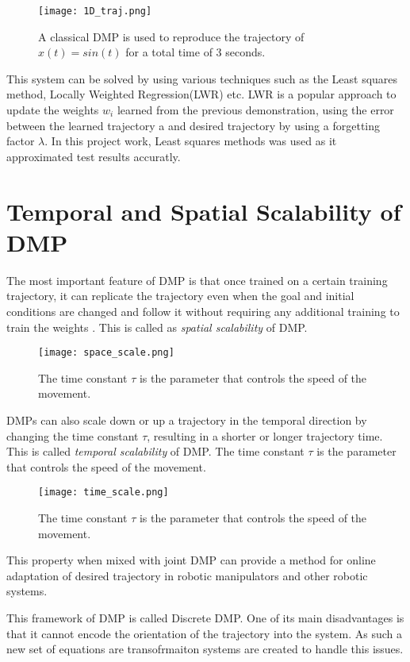 \begin{figure}[h]
    \centering
    \texttt{[image: 1D\_traj.png]}
    \caption{A classical DMP is used to reproduce the trajectory of $x(t) = sin(t)$ for a total time of 3 seconds.} %
\end{figure}
This system can be solved by using various techniques such as the Least squares method, Locally Weighted Regression(LWR)\cite{LWR_paper} etc.
LWR is a popular approach to update the weights $w_i$ learned from the previous demonstration, using the error between the learned trajectory a
and desired trajectory by using a forgetting factor $\lambda$. In this project work, Least squares methods was used as it approximated test results accuratly.

\section{Temporal and Spatial Scalability of DMP}

The most important feature of DMP is that once trained on a certain training trajectory, it can replicate the trajectory
even when the goal and initial conditions are changed and follow it without requiring any additional training to train the weights\cite{Ijspeert2013}
\cite{ginesi2021overcoming}. This is called
as \textit{spatial scalability} of DMP.

\begin{figure}[h]
    \centering
    \texttt{[image: space\_scale.png]}
    \caption{The time constant $\tau$ is the parameter that controls the speed of the movement.}
\end{figure}
DMPs can also scale down or up a trajectory in the temporal direction by changing the time constant $\tau$, resulting in a shorter or longer trajectory time.
This is called \textit{temporal scalability} of DMP. The time constant $\tau$ is the parameter that controls the speed of the movement.
\begin{figure}[h]
    \centering
    \texttt{[image: time\_scale.png]}
    \caption{The time constant $\tau$ is the parameter that controls the speed of the movement.}
\end{figure}

This property when mixed with joint DMP can provide a method for online adaptation of desired trajectory in robotic manipulators and other robotic systems.

This framework of DMP is called Discrete DMP. One of its main disadvantages is that it cannot encode the orientation of the trajectory into the system.
As such a new set of equations are transofrmaiton systems are created to handle this issues.